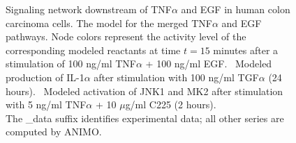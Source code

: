 \documentclass{bmcart}
\begin{document}
\begin{backmatter}
\begin{figure}[!htpb]
\caption{Signaling network downstream of TNF$\alpha$ and EGF in human colon carcinoma cells.
{\bf \protect{}}
The model for the merged TNF$\alpha$ and EGF pathways. Node colors represent the
activity level of the corresponding modeled reactants at time $t = 15$ minutes after
a stimulation of 100 ng/ml TNF$\alpha$ + 100 ng/ml EGF.
{\bf \protect{}}~Modeled production of IL-1$\alpha$ after stimulation with 100 ng/ml TGF$\alpha$ (24 hours).
{\bf \protect{}}~Modeled activation of JNK1 and MK2 after stimulation with 5 ng/ml TNF$\alpha$ + 10 $\mu$g/ml C225 (2 hours).
\\
The {\sf \_{}data} suffix identifies experimental data; all other series are computed by ANIMO.}\label{fig:large-model-all}
\end{figure}



\end{backmatter}
\end{document}
